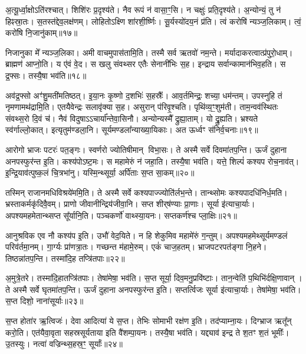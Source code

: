 अ॒त्यू॒र्ध्वा॒क्षोऽति॑रश्चात्। शिशि॑रः प्र॒दृश्य॑ते। 
नैव रूपं न॑ वासा॒ꣳ॒सि। न चक्षुः॑ प्रति॒दृश्य॑ते। 
अ॒न्योन्यं॒ तु न॑ हिꣴस्रा॒तः। स॒तस्त॑द्देव॒लक्ष॑णम्। 
लोहितोऽक्ष्णि शा॑रशी॒र्ष्णिः। सू॒र्यस्यो॑दय॒नं प्र॑ति। 
त्वं करोषि॑ न्यञ्ज॒लिकाम्। त्वं॒ करो॑षि नि॒जानु॑काम्॥१७॥

निजानुका मे᳚ न्यञ्ज॒लिका। अमी वाचमुपास॑तामि॒ति। 
तस्मै सर्व ऋतवो॑ नम॒न्ते। मर्यादाकरत्वात्प्र॑\-पुरो॒धाम्। 
ब्राह्मण॑ आप्नो॒ति। य ए॑वं वे॒द। स खलु संवथ्सर एतैः सेनानी॑भिः स॒ह। 
इन्द्राय सर्वान्कामान॑भिव॒हति। स द्र॒फ्सः। तस्यै॒षा भव॑ति॥१८॥

अव॑द्र॒फ्सो अꣳ॑शु॒मती॑मतिष्ठत्। इ॒या॒नः कृ॒ष्णो द॒शभिः॑ स॒हस्रैः᳚। 
आव॒र्तमिन्द्रः॒ शच्या॒ धम॑न्तम्। उपस्नुहि तं नृमणामथ॑द्रामि॒ति। 
एतयैवेन्द्रः सलावृ॑क्या स॒ह। असुरान्‌ प॑रिवृ॒श्चति। 
पृथि॑व्य॒ꣳ॒शुम॑ती। ताम॒न्वव॑स्थितः संवथ्स॒रो दि॒वं च॑। 
नैवं विदुषाऽऽचार्या᳚न्तेवा॒सिनौ। अन्योन्यस्मै᳚ द्रुह्या॒ताम्। यो द्रु॒ह्यति। 
भ्रश्यते स्व॑र्गाल्लो॒कात्। इत्यृतुम॑ण्डला॒नि। 
सूर्यमण्डला᳚न्या\-ख्या॒यिकाः। अत ऊर्ध्वꣳ स॑निर्व॒चनाः॥१९॥\anuvakamend


आरोगो भ्राजः पटरः॑ पत॒ङ्गः। स्वर्णरो ज्योतिषीमान् विभा॒सः। 
ते अस्मै सर्वे दिवमा॑तप॒न्ति। ऊर्जं दुहाना अनपस्फुर॑न्त इ॒ति। 
कश्य॑पोऽष्ट॒मः। स महामेरुं न॑ जहा॒ति। 
तस्यै॒षा भव॑ति। यत्ते॒ शिल्पं॑ कश्यप रोच॒नाव॑त्। 
इ॒न्द्रि॒याव॑त्पुष्क॒लं चि॒त्रभा॑नु। यस्मि॒न्थ्सूर्या॒ अर्पि॑ताः स॒प्त सा॒कम्॥२०॥

तस्मिन्‌ राजानमधिविश्रये॑ममि॒ति। ते अस्मै सर्वे कश्यपाज्ज्यो\-ति॑र्लभ॒न्ते। 
तान्थ्सोमः कश्यपादधि॑निर्ध॒मति। भ्रस्ताकर्मकृ॑दिवै॒वम्। 
प्राणो जीवानीन्द्रिय॑जीवा॒नि। सप्त शीर्‌ष॑ण्याः प्रा॒णाः। 
सूर्या इ॑त्याचा॒र्याः। अपश्यमहमेतान्थ्सप्त सू᳚र्यानि॒ति। 
पञ्च\-कर्णो॑ वाथ्स्या॒यनः। सप्तकर्ण॑श्च प्ला॒क्षिः॥२१॥

आनुश्रविक एव नौ कश्य॑प इ॒ति। उभौ॑ वेद॒यिते। 
न हि शेकुमिव महामे॑रुं ग॒न्तुम्। अपश्यमहमेथ्सूर्यमण्डलं परिव॑र्तमा॒नम्। 
गा॒र्ग्यः प्रा॑णत्रा॒तः। गच्छन्त म॑हामे॒रुम्। एकं॑ चाज॒हतम्। 
भ्राजपटरपत॑ङ्गा नि॒हने। तिष्ठन्ना॑तप॒न्ति। तस्मा॑दि॒ह तप्त्रि॑तपाः॥२२॥

अ॒मुत्रे॒तरे। तस्मा॑दि॒हातप्त्रि॑तपाः। तेषा॑मेषा॒ भव॑ति। 
स॒प्त सूर्या॒ दिव॒मनु॒प्रवि॑ष्टाः। तान॒न्वेति॑ प॒थिभि॑र्दक्षि॒णावान्। 
ते अस्मै सर्वे घृतमा॑तप॒न्ति। ऊर्जं दुहाना अनपस्फुर॑न्त इ॒ति। 
सप्तर्त्विजः सूर्या इ॑त्याचा॒र्याः। तेषा॑मेषा॒ भव॑ति। स॒प्त दिशो॒ नाना॑सूर्याः॥२३॥

स॒प्त होता॑र ऋ॒त्विजः॑। देवा आदित्या॑ ये स॒प्त। 
तेभिः सोमाभी रक्ष॑ण इ॒ति। तद॑प्याम्ना॒यः। 
दिग्भ्राज ऋतू᳚न्‌ करो॒ति। एत॑यैवा॒वृता सहस्रसूर्यताया इति वै॑शम्पा॒यनः। 
तस्यै॒षा भव॑ति। यद्द्याव॑ इन्द्र ते श॒तꣳ श॒तं भूमीः᳚। 
उ॒तस्युः। नत्वा॑ वज्रिन्थ्स॒हस्र॒ꣳ॒ सूर्याः᳚॥२४॥

